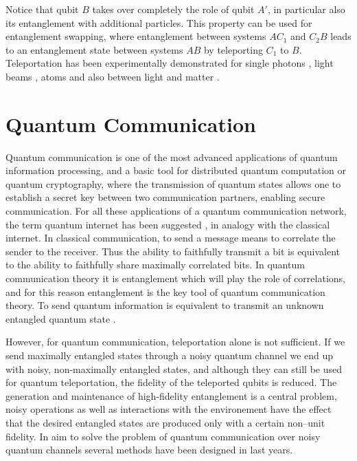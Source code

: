 \documentclass[10pt,a4paper]{book}
\numberwithin{equation}{chapter}
\numberwithin{figure}{chapter}
\numberwithin{table}{chapter}
\begin{document}
Notice that qubit $B$ takes over completely the role of qubit $A'$, in particular also its entanglement with additional particles. This property can be used for entanglement swapping, where entanglement between systems $AC_1$ and $C_2 B$ leads to an entanglement state between systems $AB$ by teleporting $C_1$ to $B$. Teleportation has been experimentally demonstrated for single photons \cite{teleportphotons}, light beams \cite{teleportbeams}, atoms \cite{teleportatoms} and also between light and matter \cite{teleportmatter}.

\chapter{Quantum Communication} \label{chap:QN}
Quantum communication is one of the most advanced applications of quantum information processing, and a basic tool for distributed quantum computation or quantum cryptography, where the transmission of quantum states allows one to establish a secret key between two communication partners, enabling secure communication. For all these applications of a quantum communication network, the term quantum internet has been suggested \cite{QI}, in analogy with the classical internet. In classical communication, to send a message means to correlate the sender to the receiver. Thus the ability to faithfully transmit a bit is equivalent to the ability to faithfully share maximally correlated bits. In quantum communication theory it is entanglement which will play the role of correlations, and for this reason entanglement is the key tool of quantum communication theory. To send quantum information is equivalent to transmit an unknown entangled quantum state \cite{teleportation}. 

However, for quantum communication, teleportation alone is not sufficient. If we send maximally entangled states through a noisy quantum channel we end up with noisy, non-maximally entangled states, and although they can still be used for quantum teleportation, the fidelity of the teleported qubits is reduced. The generation and maintenance of high-fidelity entanglement is a central problem, noisy operations as well as interactions with the environement have the effect that the desired entangled states are produced only with a certain non–unit fidelity. In aim to solve the problem of quantum communication over noisy quantum channels several methods have been designed in last years.
\end{document}
